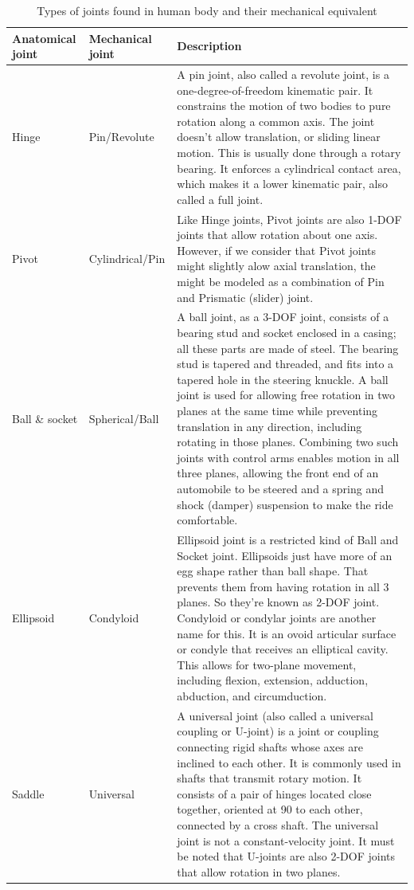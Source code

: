 \documentclass[conference]{IEEEtran}
\begin{document}
{\begin{table}[htbp]
    \caption{Types of joints found in human body and their mechanical equivalent}
    \begin{center}
        \begin{tabular}{|Y|Y|m{110px}|}
            \hline
            Anatomical joint & Mechanical joint & Description \\
            \hline
            Hinge & Pin/Revolute & A pin joint, also called a revolute joint, is a one-degree-of-freedom kinematic pair. It constrains the motion of two bodies to pure rotation along a common axis. The joint doesn't allow translation, or sliding linear motion. This is usually done through a rotary bearing. It enforces a cylindrical contact area, which makes it a lower kinematic pair, also called a full joint.\\
            \hline
            Pivot & Cylindrical/Pin & Like Hinge joints, Pivot joints are also 1-DOF joints that allow rotation about one axis. However, if we consider that Pivot joints might slightly alow axial translation, the might be modeled as a combination of Pin and Prismatic (slider) joint.\\
            \hline
            Ball \& socket & Spherical/Ball & A ball joint, as a 3-DOF joint, consists of a bearing stud and socket enclosed in a casing; all these parts are made of steel. The bearing stud is tapered and threaded, and fits into a tapered hole in the steering knuckle. A ball joint is used for allowing free rotation in two planes at the same time while preventing translation in any direction, including rotating in those planes. Combining two such joints with control arms enables motion in all three planes, allowing the front end of an automobile to be steered and a spring and shock (damper) suspension to make the ride comfortable.\\
            \hline
            Ellipsoid & Condyloid & Ellipsoid joint is a restricted kind of Ball and Socket joint. Ellipsoids just have more of an egg shape rather than ball shape. That prevents them from having rotation in all 3 planes. So they're known as 2-DOF joint. Condyloid or condylar joints are another name for this. It is an ovoid articular surface or condyle that receives an elliptical cavity. This allows for two-plane movement, including flexion, extension, adduction, abduction, and circumduction.\\
            \hline
            Saddle & Universal & A universal joint (also called a universal coupling or U-joint) is a joint or coupling connecting rigid shafts whose axes are inclined to each other. It is commonly used in shafts that transmit rotary motion. It consists of a pair of hinges located close together, oriented at 90 to each other, connected by a cross shaft. The universal joint is not a constant-velocity joint. It must be noted that U-joints are also 2-DOF joints that allow rotation in two planes.\\
            \hline
        \end{tabular}
    \end{center}
    \label{tab:table_one}
\end{table}


}
\end{document}
